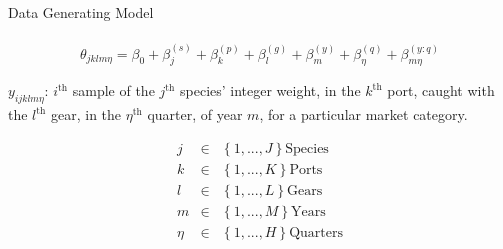 \documentclass[ xcolor = pdftex, dvipsnames, table ]{beamer}
\begin{document}
\begin{frame}{Data Generating Model}
{\begin{gather*}
\end{gather*}
\vspace{-0.2cm}
\begin{equation*}
        \theta_{jklm\eta} = \beta_0 + \beta^{(s)}_j + \beta^{(p)}_k + \beta^{(g)}_l + \beta^{(y)}_m + \beta^{(q)}_\eta + \beta^{(y:q)}_{m\eta}   %
\end{equation*}
\hspace{-0.5cm}
\begin{minipage}[h!]{0.55\textwidth}
	$~$\\
	$y_{ijklm\eta}$: $i^{\text{th}}$ sample of the $j^{\text{th}}$ species' integer weight, in the $k^{\text{th}}$ port, caught with the $l^{\text{th}}$ gear, in the $\eta^{\text{th}}$ \mbox{quarter,} of year $m$, for a particular market \mbox{category.}
\end{minipage}
\begin{minipage}{0.45\textwidth}
	\vspace{-0.5cm}
	\hspace{4cm}
        \begin{eqnarray*}
        j &\in&\left\{1, ..., J\right\} \text{Species}\\
        k &\in&\left\{1, ..., K\right\} \text{Ports}\\
        l &\in&\left\{1, ..., L\right\} \text{Gears}\\
        m &\in&\left\{1, ..., M\right\} \text{Years}\\
        \eta &\in&\left\{1, ..., H\right\} \text{Quarters}
        \end{eqnarray*}
\end{minipage}
}
\end{frame}

%
%
\end{document}
